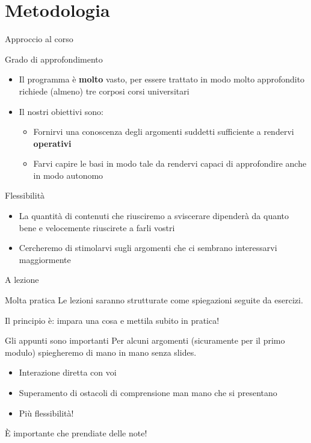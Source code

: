 \documentclass[presentation]{beamer} %
\begin{document}
\section{Metodologia}

\begin{frame}{Approccio al corso}
	\begin{block}{Grado di approfondimento}
		\begin{itemize}
			\item Il programma è \textbf{molto} vasto, per essere trattato in modo molto approfondito richiede (almeno) tre corposi corsi universitari
			\item Il nostri obiettivi sono:
				\begin{itemize}
					\item Fornirvi una conoscenza degli argomenti suddetti sufficiente a rendervi \textbf{operativi}
					\item Farvi capire le basi in modo tale da rendervi capaci di approfondire anche in modo autonomo
				\end{itemize}
		\end{itemize}
	\end{block}
	\begin{block}{Flessibilità}
		\begin{itemize}
			\item La quantità di contenuti che riusciremo a sviscerare dipenderà da quanto bene e velocemente riuscirete a farli vostri
			\item Cercheremo di stimolarvi sugli argomenti che ci sembrano interessarvi maggiormente
		\end{itemize}
	\end{block}
\end{frame}

\begin{frame}{A lezione}
	\begin{block}{Molta pratica}
		Le lezioni saranno strutturate come spiegazioni seguite da esercizi.
		
		Il principio è: impara una cosa e mettila subito in pratica!
	\end{block}
	\begin{block}{Gli appunti sono importanti}
		Per alcuni argomenti (sicuramente per il primo modulo) spiegheremo di mano in mano senza slides.
		\begin{itemize}
			\item Interazione diretta con voi
			\item Superamento di ostacoli di comprensione man mano che si presentano
			\item Più flessibilità!
		\end{itemize}
		È importante che prendiate delle note!
	\end{block}
\end{frame}

\section*{\refname}
\end{document}
